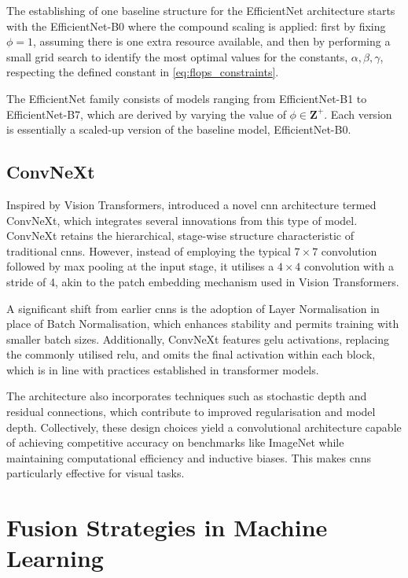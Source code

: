 The establishing of one baseline structure for the EfficientNet architecture starts with the EfficientNet-B0 where the compound scaling is applied: first by fixing $\phi = 1$, assuming there is one extra resource available, and then by performing a small grid search to identify the most optimal values for the constants, $\alpha, \beta, \gamma$, respecting the defined constant in \ref{eq:flops_constraints}.

The EfficientNet family consists of models ranging from EfficientNet-B1 to EfficientNet-B7, which are derived by varying the value of \(\phi \in \mathbf{Z^+}\). Each version is essentially a scaled-up version of the baseline model, EfficientNet-B0.



\subsection{ConvNeXt}
Inspired by Vision Transformers, \textcite{liu_convnet_2022} introduced a novel \ac{cnn} architecture termed ConvNeXt, which integrates several innovations from this type of model. ConvNeXt retains the hierarchical, stage-wise structure characteristic of traditional \ac{cnn}s. However, instead of employing the typical $7\times7$ convolution followed by max pooling at the input stage, it utilises a $4\times4$ convolution with a stride of 4, akin to the patch embedding mechanism used in Vision Transformers.

A significant shift from earlier \acp{cnn} is the adoption of Layer Normalisation in place of Batch Normalisation, which enhances stability and permits training with smaller batch sizes. Additionally, ConvNeXt features \ac{gelu} activations, replacing the commonly utilised \ac{relu}, and omits the final activation within each block, which is in line with practices established in transformer models.

The architecture also incorporates techniques such as stochastic depth and residual connections, which contribute to improved regularisation and model depth. Collectively, these design choices yield a convolutional architecture capable of achieving competitive accuracy on benchmarks like ImageNet while maintaining computational efficiency and inductive biases. This makes \acp{cnn} particularly effective for visual tasks.

\section{Fusion Strategies in Machine Learning}

